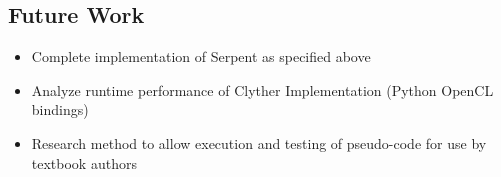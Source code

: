 \subsection{Future Work}
\begin{itemize}
\item Complete implementation of Serpent as specified above
\item Analyze runtime performance of Clyther Implementation (Python OpenCL bindings)
\item Research method to allow execution and testing of pseudo-code for use by textbook authors
\end{itemize}
